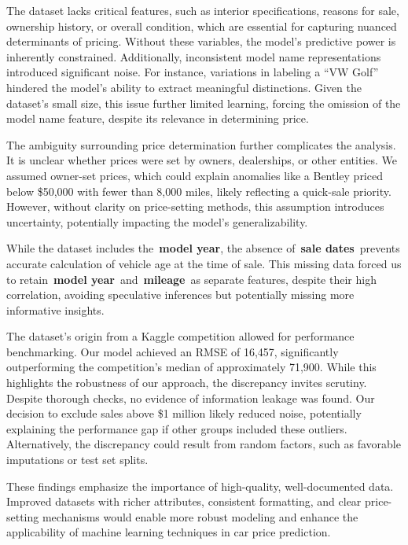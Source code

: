 \documentclass[a4paper,oneside,bibliography=totoc]{scrbook}
\begin{document}
The dataset lacks critical features, such as interior specifications, reasons for sale, ownership history, or overall condition, which are essential for capturing nuanced determinants of pricing. Without these variables, the model's predictive power is inherently constrained. Additionally, inconsistent model name representations introduced significant noise. For instance, variations in labeling a ``VW Golf'' hindered the model's ability to extract meaningful distinctions. Given the dataset's small size, this issue further limited learning, forcing the omission of the model name feature, despite its relevance in determining price.

The ambiguity surrounding price determination further complicates the analysis. It is unclear whether prices were set by owners, dealerships, or other entities. We assumed owner-set prices, which could explain anomalies like a Bentley priced below \$50,000 with fewer than 8,000 miles, likely reflecting a quick-sale priority. However, without clarity on price-setting methods, this assumption introduces uncertainty, potentially impacting the model's generalizability.

While the dataset includes the~\textbf{model year}, the absence of~\textbf{sale dates}~prevents accurate calculation of vehicle age at the time of sale. This missing data forced us to retain~\textbf{model year}~and~\textbf{mileage}~as separate features, despite their high correlation, avoiding speculative inferences but potentially missing more informative insights.

The dataset's origin from a Kaggle competition allowed for performance benchmarking. Our model achieved an RMSE of 16,457, significantly outperforming the competition's median of approximately 71,900. While this highlights the robustness of our approach, the discrepancy invites scrutiny. Despite thorough checks, no evidence of information leakage was found. Our decision to exclude sales above \$1 million likely reduced noise, potentially explaining the performance gap if other groups included these outliers. Alternatively, the discrepancy could result from random factors, such as favorable imputations or test set splits.

These findings emphasize the importance of high-quality, well-documented data. Improved datasets with richer attributes, consistent formatting, and clear price-setting mechanisms would enable more robust modeling and enhance the applicability of machine learning techniques in car price prediction.
\end{document}
